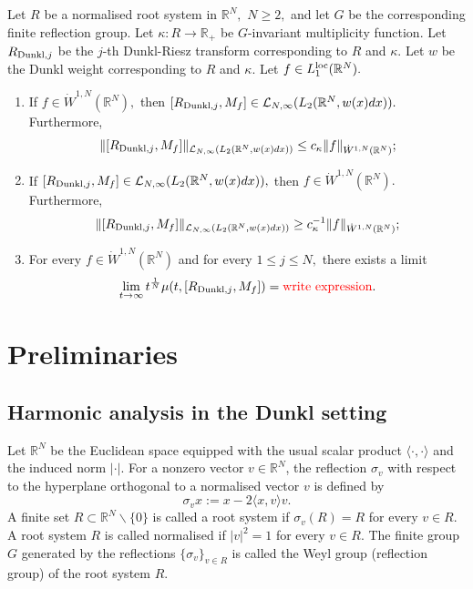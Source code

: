 \documentclass{amsart}
\begin{document}
\begin{theorem}\label{main theorem} Let $R$ be a normalised root system in $\mathbb{R}^N,$ $N\geq 2,$ and let $G$ be the corresponding finite reflection group. Let $\kappa:R\to\mathbb{R}_+$ be $G$-invariant multiplicity function. Let $R_{{\rm Dunkl},j}$ be the $j$-th Dunkl-Riesz transform corresponding to $R$ and $\kappa.$ Let $w$ be the Dunkl weight corresponding to $R$ and $\kappa.$ Let $f\in L_1^{{\rm loc}}(\mathbb{R}^N).$
\begin{enumerate}[{\rm (i)}]
\item\label{mta} If $f\in\dot{W}^{1,N}(\mathbb{R}^N),$ then $[R_{{\rm Dunkl},j},M_f]\in\mathcal{L}_{N,\infty}(L_2(\mathbb{R}^N,w(x)dx)).$ Furthermore,
$$\|[R_{{\rm Dunkl},j},M_f]\|_{\mathcal{L}_{N,\infty}(L_2(\mathbb{R}^N,w(x)dx))}\leq c_{\kappa}\|f\|_{\dot{W}^{1,N}(\mathbb{R}^N)};$$
\item\label{mtb} If $[R_{{\rm Dunkl},j},M_f]\in\mathcal{L}_{N,\infty}(L_2(\mathbb{R}^N,w(x)dx)),$ then $f\in\dot{W}^{1,N}(\mathbb{R}^N).$ Furthermore,
$$\|[R_{{\rm Dunkl},j},M_f]\|_{\mathcal{L}_{N,\infty}(L_2(\mathbb{R}^N,w(x)dx))}\geq c_{\kappa}^{-1}\|f\|_{\dot{W}^{1,N}(\mathbb{R}^N)};$$
\item\label{mtc} For every $f\in\dot{W}^{1,N}(\mathbb{R}^N)$ and for every $1\leq j\leq N,$ there exists a limit
$$\lim_{t\to\infty}t^{\frac1N}\mu(t,[R_{{\rm Dunkl},j},M_f])=\mbox{{\color{red} write expression}}.$$
\end{enumerate}
\end{theorem}

\section{Preliminaries}
\setcounter{equation}{0}
\subsection{Harmonic analysis in the Dunkl setting}
Let $\mathbb{R}^N$ be the Euclidean space equipped with the usual scalar product $\langle \cdot,\cdot\rangle $ and the induced norm $|\cdot|.$ For a nonzero vector $v\in \mathbb{R}^N$, the reflection $\sigma_v$ with respect to the hyperplane orthogonal to a normalised vector $v$ is defined by
$$\sigma_v x:= x-2\langle x,v\rangle v.$$
A finite set $R\subset \mathbb{R}^N\backslash \{0\}$ is called a root system if $\sigma_v(R)=R$ for every $v\in R.$ A root system $R$ is called normalised if $|v|^2=1$ for every $v\in R.$
The finite group $G$ generated by the reflections $\{\sigma_v\}_{v\in R}$ is called the Weyl group (reflection group) of the root system $R.$
\end{document}
